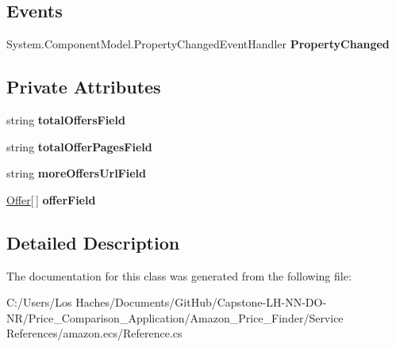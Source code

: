 \subsection*{Events}
\begin{DoxyCompactItemize}
\item 
\hypertarget{class_price___comparison_1_1amazon_1_1ecs_1_1_offers_af6c1d2614e4de7fb6a6cb87e44ff8c47}{System.\-Component\-Model.\-Property\-Changed\-Event\-Handler {\bfseries Property\-Changed}}\label{class_price___comparison_1_1amazon_1_1ecs_1_1_offers_af6c1d2614e4de7fb6a6cb87e44ff8c47}

\end{DoxyCompactItemize}
\subsection*{Private Attributes}
\begin{DoxyCompactItemize}
\item 
\hypertarget{class_price___comparison_1_1amazon_1_1ecs_1_1_offers_a341fe8ea2d900291d313df00b330d268}{string {\bfseries total\-Offers\-Field}}\label{class_price___comparison_1_1amazon_1_1ecs_1_1_offers_a341fe8ea2d900291d313df00b330d268}

\item 
\hypertarget{class_price___comparison_1_1amazon_1_1ecs_1_1_offers_a213fe920d06bac9239de60dda3b10202}{string {\bfseries total\-Offer\-Pages\-Field}}\label{class_price___comparison_1_1amazon_1_1ecs_1_1_offers_a213fe920d06bac9239de60dda3b10202}

\item 
\hypertarget{class_price___comparison_1_1amazon_1_1ecs_1_1_offers_a1226390f79b64afb70ff9762e0d398b7}{string {\bfseries more\-Offers\-Url\-Field}}\label{class_price___comparison_1_1amazon_1_1ecs_1_1_offers_a1226390f79b64afb70ff9762e0d398b7}

\item 
\hypertarget{class_price___comparison_1_1amazon_1_1ecs_1_1_offers_af3308f3c541a3955825581e0bedd67a9}{\hyperlink{class_price___comparison_1_1amazon_1_1ecs_1_1_offer}{Offer}\mbox{[}$\,$\mbox{]} {\bfseries offer\-Field}}\label{class_price___comparison_1_1amazon_1_1ecs_1_1_offers_af3308f3c541a3955825581e0bedd67a9}

\end{DoxyCompactItemize}


\subsection{Detailed Description}


The documentation for this class was generated from the following file\-:\begin{DoxyCompactItemize}
\item 
C\-:/\-Users/\-Los Haches/\-Documents/\-Git\-Hub/\-Capstone-\/\-L\-H-\/\-N\-N-\/\-D\-O-\/\-N\-R/\-Price\-\_\-\-Comparison\-\_\-\-Application/\-Amazon\-\_\-\-Price\-\_\-\-Finder/\-Service References/amazon.\-ecs/Reference.\-cs\end{DoxyCompactItemize}
